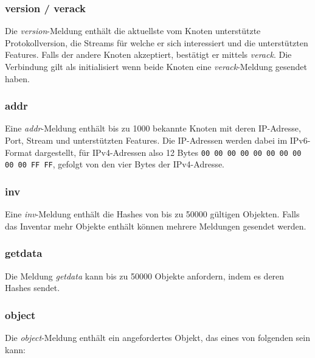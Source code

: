 \documentclass{bfh}
\newcommand{\msg}[1]{\textit{\textcolor{RedOrange}{#1}}}
\begin{document}
  \subsubsection{version / verack}
  Die \msg{version}-Meldung enthält die aktuellste vom Knoten unterstützte Protokollversion, die Streams für welche er sich interessiert und die unterstützten Features. Falls der andere Knoten akzeptiert, bestätigt er mittels \msg{verack}. Die Verbindung gilt als initialisiert wenn beide Knoten eine \msg{verack}-Meldung gesendet haben.

  \subsubsection{addr}
  Eine \msg{addr}-Meldung enthält bis zu 1000 bekannte Knoten mit deren IP-Adresse, Port, Stream und unterstützten Features. Die IP-Adressen werden dabei im IPv6-Format dargestellt, für IPv4-Adressen also 12 Bytes \texttt{00 00 00 00 00 00 00 00 00 00 FF FF}, gefolgt von den vier Bytes der IPv4-Adresse.

  \subsubsection{inv}
  Eine \msg{inv}-Meldung enthält die Hashes von bis zu 50000 gültigen Objekten. Falls das Inventar mehr Objekte enthält können mehrere Meldungen gesendet werden.

  \subsubsection{getdata}
  Die Meldung \msg{getdata} kann bis zu 50000 Objekte anfordern, indem es deren Hashes sendet.

  \subsubsection{object}
  Die \msg{object}-Meldung enthält ein angefordertes Objekt, das eines von folgenden sein kann:

\end{document}
